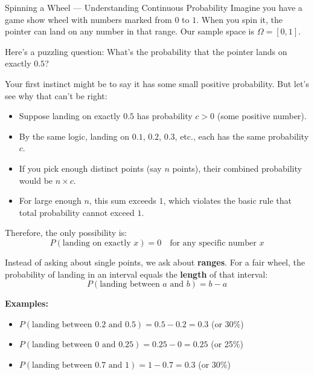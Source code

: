 \begin{itemize}
\begin{exampleboxbreak}{Spinning a Wheel — Understanding Continuous Probability}
Imagine you have a game show wheel with numbers marked from $0$ to $1$. When you spin it, the pointer can land on any number in that range. Our sample space is $\Omega = [0,1]$.


Here's a puzzling question: What's the probability that the pointer lands on exactly $0.5$?

Your first instinct might be to say it has some small positive probability. But let's see why that can't be right:
\begin{itemize}
    \item Suppose landing on exactly $0.5$ has probability $c > 0$ (some positive number).
    \item By the same logic, landing on $0.1$, $0.2$, $0.3$, etc., each has the same probability $c$.
    \item If you pick enough distinct points (say $n$ points), their combined probability would be $n \times c$.
    \item For large enough $n$, this sum exceeds $1$, which violates the basic rule that total probability cannot exceed $1$.
\end{itemize}

Therefore, the only possibility is:
\[
P(\text{landing on exactly } x) = 0 \quad \text{for any specific number } x
\]


Instead of asking about single points, we ask about \textbf{ranges}. For a fair wheel, the probability of landing in an interval equals the \textbf{length} of that interval:
\[
P(\text{landing between } a \text{ and } b) = b - a
\]

\textbf{Examples:}
\begin{itemize}
    \item $P(\text{landing between } 0.2 \text{ and } 0.5) = 0.5 - 0.2 = 0.3$ (or 30\%)
    \item $P(\text{landing between } 0 \text{ and } 0.25) = 0.25 - 0 = 0.25$ (or 25\%)
    \item $P(\text{landing between } 0.7 \text{ and } 1) = 1 - 0.7 = 0.3$ (or 30\%)
\end{itemize}



\end{exampleboxbreak}
\end{itemize}
